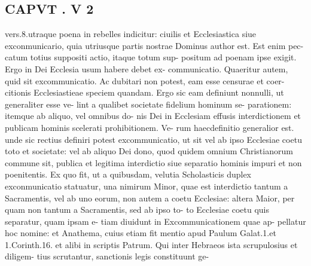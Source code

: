 \documentclass{article}
\begin{document}
\begin{pages}
\section*{CAPVT . V 2 }vers.8.utraque poena in rebelles indicitur: ciuilis et Ecclesiastica siue exconmunicario, quia utriusque partis nostrae Dominus author est. Est enim pec- catum totius suppositi actio, itaque totum sup- positum ad poenam ipse exigit. Ergo in Dei Ecclesia usum habere debet ex- communicatio. Quaeritur autem, quid sit excommunicatio. Ac dubitari non potest, eam esse censurae et coer- citionis Ecclesiastieae speciem quandam. Ergo sic eam definiunt nonnulli, ut generaliter esse ve- lint a qualibet societate fidelium hominum se- parationem: itemque ab aliquo, vel omnibus do- nis Dei in Ecclesiam effusis interdictionem et publicam hominis scelerati prohibitionem. Ve- rum haecdefinitio generalior est. unde sic rectius definiri potest excommunicatio, ut sit vel ab ipso Ecclesiae coetu toto et societate: vel ab aliquo Dei dono, quod quidem omnium Christianorum commune sit, publica et legitima interdictio siue separatio hominis impuri et non poenitentis. Ex quo fit, ut a quibusdam, velutia Scholasticis duplex exconmunicatio statuatur, una nimirum Minor, quae est interdictio tantum a Sacramentis, vel ab uno eorum, non autem a coetu Ecclesiae: altera Maior, per quam non tantum a Sacramentis, sed ab ipso to- to Ecclesiae coetu quis separatur, quam ipsam e- tiam diuidunt in Excommunicationem quae ap- pellatur hoc nomine: et Anathema, cuius etiam fit mentio apud Paulum Galat.1.et 1.Corinth.16. et alibi in scriptis Patrum. Qui inter Hebraeos ista scrupulosius et diligem- tius scrutantur, sanctionis legis constituunt ge- 

\end{pages}
\end{document}
